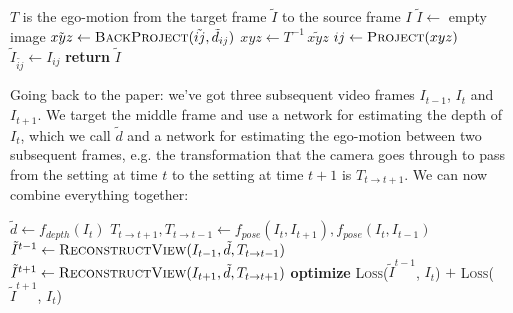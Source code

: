 \begin{algorithmic}[1]
\Require $T$ is the ego-motion from the target frame $\tilde{I}$ to the source frame $I$
	\State $\tilde{I} \gets$ empty image
		\State $\tilde{xyz} \gets \textsc{BackProject}(\tilde{ij}, \tilde{d}_{ij})$
		\State $xyz \gets T^{-1} \, \tilde{xyz}$
		\State $ij \gets \textsc{Project}(xyz)$
		\State $\tilde{I}_{\tilde{ij}} \gets I_{ij}$ 
	\EndFor
	\State \textbf{return} $\tilde{I}$
\EndFunction
\Statex
\end{algorithmic}

Going back to the paper: we've got three subsequent video frames $I_{t-1}$, $I_{t}$ and $I_{t+1}$. We target the middle frame and use a network for estimating the depth of $I_{t}$, which we call $\tilde{d}$ and a network for estimating the ego-motion between two subsequent frames, e.g. the transformation that the camera goes through to pass from the setting at time $t$ to the setting at time $t+1$ is $T_{t \rightarrow t+1}$. We can now combine everything together:\\

\begin{algorithmic}[1]
\State $\tilde{d} \gets f_{depth}(I_{t})$ 
\State $T_{t \rightarrow t+1},  T_{t \rightarrow t-1} \gets f_{pose}(I_{t}, I_{t+1}), f_{pose}(I_{t}, I_{t-1})$ 	
\State $\tilde{I}^{t-1} \gets \textsc{ReconstructView}(I_{t-1}, \tilde{d}, T_{t \rightarrow t-1})$
\State $\tilde{I}^{t+1} \gets \textsc{ReconstructView}(I_{t+1}, \tilde{d}, T_{t \rightarrow t+1})$
\State \textbf{optimize} \textsc{Loss}($\tilde{I}^{t-1}$, $I_{t}$) $+$  \textsc{Loss}($\tilde{I}^{t+1}$, $I_{t}$)
\Statex
\end{algorithmic}

